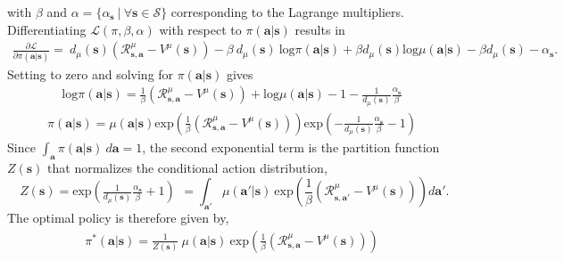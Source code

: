 \documentclass{article} \usepackage{iclr2020_conference,times}
\def\rva{{\mathbf{a}}}
\def\rvs{{\mathbf{s}}}
\begin{document}
with $\beta$ and $\alpha = \{\alpha_\rvs \ | \ \forall \rvs \in \mathcal{S}\}$ corresponding to the Lagrange multipliers. Differentiating $\mathcal{L}(\pi, \beta, \alpha)$ with respect to $\pi(\rva|\rvs)$ results in
\begin{equation}
\begin{aligned}
    \frac{\partial \mathcal{L}}{ \partial \pi(\rva | \rvs)} = \ d_\mu(\rvs) \left( \mathcal{R}_{\rvs, \rva}^\mu - V^\mu(\rvs) \right) - \beta \ d_\mu(\rvs) \ \mathrm{log} \pi(\rva|\rvs) + \beta d_\mu(\rvs) \mathrm{log} \mu(\rva|\rvs) - \beta d_\mu(\rvs) - \alpha_\rvs.
\end{aligned}
\end{equation}
Setting to zero and solving for $\pi(\rva|\rvs)$ gives
\begin{equation}
\begin{aligned}
    \mathrm{log} \pi(\rva|\rvs) = \frac{1}{\beta}\left( \mathcal{R}_{\rvs,\rva}^\mu - V^\mu(\rvs) \right) + \mathrm{log} \mu(\rva|\rvs) - 1 - \frac{1}{d_\mu(\rvs)}\frac{\alpha_\rvs}{\beta}
\end{aligned}
\end{equation}
\begin{equation}
\begin{aligned}
    \pi(\rva|\rvs) = \mu(\rva|\rvs) \mathrm{exp}\left(\frac{1}{\beta}\left( \mathcal{R}_{\rvs,\rva}^\mu - V^\mu(\rvs) \right) \right) \mathrm{exp}\left(- \frac{1}{d_\mu(\rvs)}\frac{\alpha_\rvs}{\beta} - 1 \right)
\end{aligned}
\end{equation}
Since $\int_\rva \pi(\rva|\rvs) \ d\rva = 1$, the second exponential term is the partition function $Z(\rvs)$ that normalizes the conditional action distribution,
\begin{equation}
\begin{aligned}
    Z(\rvs) = \mathrm{exp}\left(\frac{1}{d_\mu(\rvs)}\frac{\alpha_\rvs}{\beta} + 1 \right)
\end{aligned} = \int_{\rva'} \mu(\rva'|\rvs) \ \mathrm{exp}\left(\frac{1}{\beta}\left( \mathcal{R}_{\rvs,\rva'}^\mu - V^\mu(\rvs) \right) \right) d\rva'.
\end{equation}
The optimal policy is therefore given by,
\begin{equation}
\begin{aligned}
    \pi^*(\rva|\rvs) = \frac{1}{Z(\rvs)} \ \mu(\rva|\rvs) \ \mathrm{exp}\left(\frac{1}{\beta}\left( \mathcal{R}_{\rvs,\rva}^\mu - V^\mu(\rvs) \right) \right)
\end{aligned}
\end{equation}
\end{document}
